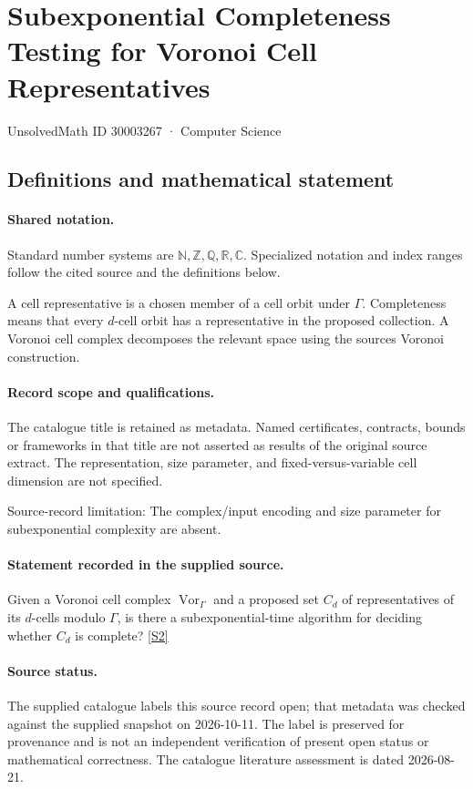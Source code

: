 \documentclass[11pt]{article}
\newcommand{\sref}[2]{\hyperlink{source:#1:#2}{[S#2]}}
\begin{document}
\setcounter{section}{30003266}
\section{Subexponential Completeness Testing for Voronoi Cell Representatives}\label{30003267}
{\small\sffamily UnsolvedMath ID 30003267 · Computer Science}
\subsection{Definitions and mathematical statement}

\paragraph{Shared notation.}Standard number systems are $\mathbb N,\mathbb Z,\mathbb Q,\mathbb R,\mathbb C$. Specialized notation and index ranges follow the cited source and the definitions below.


A cell representative is a chosen member of a cell orbit under $\Gamma$. Completeness means that every $d$-cell orbit has a representative in the proposed collection. A Voronoi cell complex decomposes the relevant space using the source\textquotesingle s Voronoi construction.
\paragraph{Record scope and qualifications.}
The catalogue title is retained as metadata. Named certificates, contracts, bounds or frameworks in that title are not asserted as results of the original source extract.
The representation, size parameter, and fixed-versus-variable cell dimension are not specified.

Source-record limitation: The complex/input encoding and size parameter for subexponential complexity are absent.
\paragraph{Statement recorded in the supplied source.}
Given a Voronoi cell complex $\operatorname{Vor}_\Gamma$ and a proposed set $C_d$ of representatives of its $d$-cells modulo $\Gamma$, is there a subexponential-time algorithm for deciding whether $C_d$ is complete? \sref{30003267}{2}
\paragraph{Source status.}
The supplied catalogue labels this source record open; that metadata was checked against the supplied snapshot on 2026-10-11. The label is preserved for provenance and is not an independent verification of present open status or mathematical correctness. The catalogue literature assessment is dated 2026-08-21.
\end{document}
